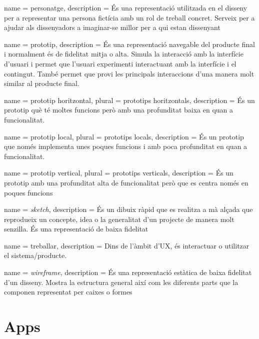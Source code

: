 {
name = personatge, description = {És una representació utilitzada en el disseny per a representar una persona fictícia amb un rol de treball concret. Serveix per a ajudar als dissenyadors a imaginar-se millor per a qui estan dissenyant}  
}

{
name = prototip, description = {És una representació navegable del producte final i normalment és de fidelitat mitja o alta. Simula la interacció amb la interfície d'usuari i permet que l'usuari experimenti interactuant amb la interfície i el contingut. També permet que provi les principals interaccions d'una manera molt similar al producte final.}
}

{
name = prototip horitzontal, plural = prototips horitzontals, description = {És un prototip què té moltes funcions però amb una profunditat baixa en quan a funcionalitat.}
}

{
name = prototip local, plural = prototips locals, description = {És un prototip que només implementa unes poques funcions i amb poca profunditat en quan a funcionalitat.}
}

{
name = prototip vertical, plural = prototips verticals, description = {És un prototip amb una profunditat alta de funcionalitat però que es centra només en poques funcions}
}

{
name = \textit{sketch}, description = {És un dibuix ràpid que es realitza a mà alçada que reprodueix un concepte, idea o la generalitat d'un projecte de manera molt senzilla. És una representació de baixa fidelitat} 
}

{
name = treballar, description = {Dins de l'àmbit d'UX, és interactuar o utilitzar el sistema/producte.} 
}

{
name = \textit{wireframe}, description = {És una representació estàtica de baixa fidelitat d'un disseny. Mostra la estructura general així com les diferents parts que la componen representat per caixes o formes}
}




\printglossary


\chapter*{Apps}
\label{sec:apps}

